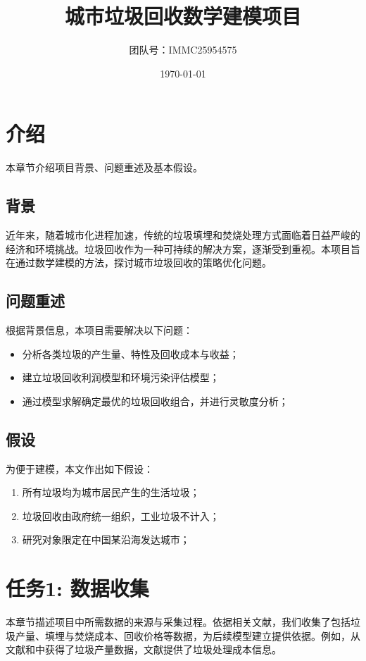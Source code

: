 \documentclass[11pt,a4paper]{ctexart} %
\title{城市垃圾回收数学建模项目}
\author{团队号：IMMC25954575}
\date{\today}
\begin{document}
\maketitle
\tableofcontents
\newpage

\section{介绍}
本章节介绍项目背景、问题重述及基本假设。

\subsection{背景}
近年来，随着城市化进程加速，传统的垃圾填埋和焚烧处理方式面临着日益严峻的经济和环境挑战。垃圾回收作为一种可持续的解决方案，逐渐受到重视。本项目旨在通过数学建模的方法，探讨城市垃圾回收的策略优化问题。

\subsection{问题重述}
根据背景信息，本项目需要解决以下问题：
\begin{itemize}
  \item 分析各类垃圾的产生量、特性及回收成本与收益；
  \item 建立垃圾回收利润模型和环境污染评估模型；
  \item 通过模型求解确定最优的垃圾回收组合，并进行灵敏度分析；
\end{itemize}

\subsection{假设}
为便于建模，本文作出如下假设：
\begin{enumerate}
  \item 所有垃圾均为城市居民产生的生活垃圾；
  \item 垃圾回收由政府统一组织，工业垃圾不计入；
  \item 研究对象限定在中国某沿海发达城市；
\end{enumerate}

\section{任务1: 数据收集}
本章节描述项目中所需数据的来源与采集过程。依据相关文献，我们收集了包括垃圾产量、填埋与焚烧成本、回收价格等数据，为后续模型建立提供依据。例如，从文献\cite{Chen2018}和\cite{Ma2019}中获得了垃圾产量数据，文献\cite{Gao2018}提供了垃圾处理成本信息。
\end{document}
